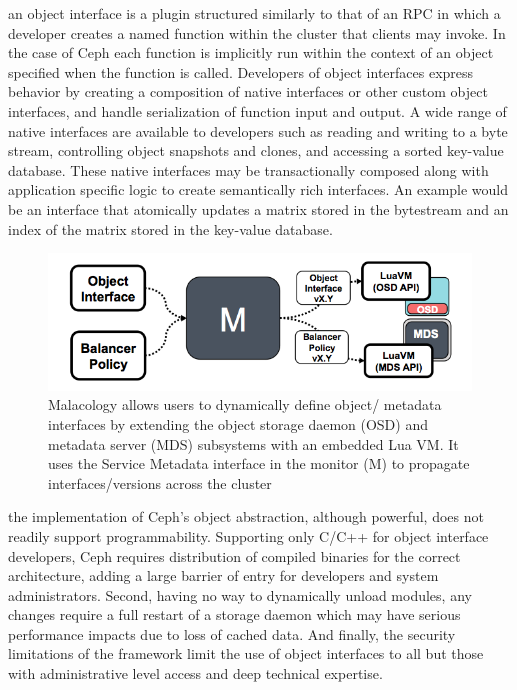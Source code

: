  an object
interface is a plugin structured similarly to that of an RPC in which a
developer creates a named function within the cluster that clients may invoke.
In the case of Ceph each function is implicitly run within the context of an
object specified when the function is called. Developers of object interfaces
express behavior by creating a composition of native interfaces or other custom
object interfaces, and handle serialization of function input and output.  A
wide range of native interfaces are available to developers such as reading and
writing to a byte stream, controlling object snapshots and clones, and
accessing a sorted key-value database. These native interfaces may be
transactionally composed along with application specific logic to create
semantically rich interfaces. An example would be an interface that atomically
updates a matrix stored in the bytestream and an index of the matrix stored in
the key-value database.\\

\begin{figure}[tbp]
\centering
\includegraphics{figures/implementation.png}
\caption{Malacology allows users to dynamically define
object/ metadata interfaces by extending the object
storage daemon (OSD) and metadata server (MDS) subsystems with an embedded Lua
VM.  It uses the Service Metadata interface in the monitor (M) to propagate
interfaces/versions across the cluster \label{fig:implementation}}
\end{figure}

 the implementation of Ceph's object
abstraction, although powerful, does not readily support programmability.
Supporting only C/C++ for object interface developers, Ceph requires
distribution of compiled binaries for the correct architecture, adding a large
barrier of entry for developers and system administrators. Second, having no
way to dynamically unload modules, any changes require a full restart of a
storage daemon which may have serious performance impacts due to loss of cached
data. And finally, the security limitations of the framework limit the use of
object interfaces to all but those with administrative level access and deep
technical expertise.


